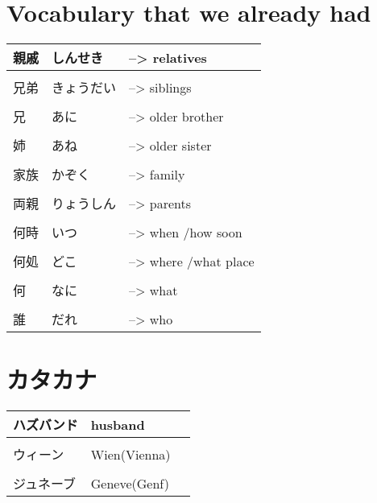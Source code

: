 \documentclass{article}
\begin{document}
\part*{Vocabulary that we already had}
\begin{tabular}{ p{3cm} | l l }
親戚&しんせき&--> relatives \\ \hline\\[-1em]
兄弟&きょうだい&--> siblings \\ \hline\\[-1em]
兄&あに&--> older brother \\ \hline\\[-1em]
姉&あね&--> older sister \\ \hline\\[-1em]
家族&かぞく&--> family \\ \hline\\[-1em]
両親&りょうしん&--> parents \\ \hline\\[-1em]
何時&いつ&--> when /how soon \\ \hline\\[-1em]
何処&どこ&--> where /what place \\ \hline\\[-1em]
何&なに&--> what \\ \hline\\[-1em]
誰&だれ&--> who %
\end{tabular}

\part*{カタカナ}
\begin{tabular}{ p{3cm} | l l }
ハズバンド&husband \\ \hline\\[-1em]
ウィーン&Wien(Vienna) \\ \hline\\[-1em]
ジュネーブ&Geneve(Genf)
\end{tabular}
\end{document}
